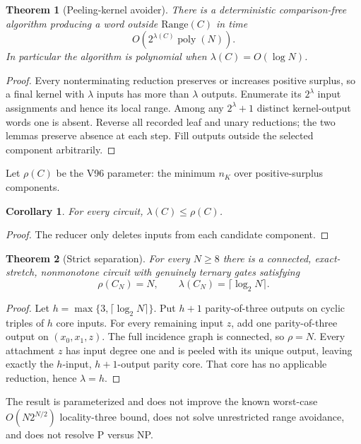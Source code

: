 \documentclass[11pt]{article}
\newtheorem{theorem}{Theorem}
\newtheorem{corollary}{Corollary}
\begin{document}
\begin{theorem}[Peeling-kernel avoider]
There is a deterministic comparison-free algorithm producing a word outside
$\mathrm{Range}(C)$ in time
\[
 O\!\left(2^{\lambda(C)}\operatorname{poly}(N)\right).
\]
In particular the algorithm is polynomial when $\lambda(C)=O(\log N)$.
\end{theorem}
\begin{proof}
Every nonterminating reduction preserves or increases positive surplus, so a
final kernel with $\lambda$ inputs has more than $\lambda$ outputs.  Enumerate
its $2^\lambda$ input assignments and hence its local range.  Among any
$2^\lambda+1$ distinct kernel-output words one is absent.  Reverse all recorded
leaf and unary reductions; the two lemmas preserve absence at each step.  Fill
outputs outside the selected component arbitrarily.
\end{proof}

Let $\rho(C)$ be the V96 parameter: the minimum $n_K$ over positive-surplus
components.

\begin{corollary}
For every circuit, $\lambda(C)\leq\rho(C)$.
\end{corollary}
\begin{proof}
The reducer only deletes inputs from each candidate component.
\end{proof}

\begin{theorem}[Strict separation]
For every $N\ge8$ there is a connected, exact-stretch, nonmonotone circuit with
genuinely ternary gates satisfying
\[
 \rho(C_N)=N,
 \qquad
 \lambda(C_N)=\lceil\log_2 N\rceil.
\]
\end{theorem}
\begin{proof}
Let $h=\max\{3,\lceil\log_2N\rceil\}$.  Put $h+1$ parity-of-three outputs on
cyclic triples of $h$ core inputs.  For every remaining input $z$, add one
parity-of-three output on $(x_0,x_1,z)$.  The full incidence graph is connected,
so $\rho=N$.  Every attachment $z$ has input degree one and is peeled with its
unique output, leaving exactly the $h$-input, $h+1$-output parity core.  That
core has no applicable reduction, hence $\lambda=h$.
\end{proof}

The result is parameterized and does not improve the known worst-case
$O(N2^{N/2})$ locality-three bound, does not solve unrestricted range avoidance,
and does not resolve P versus NP.
\end{document}

